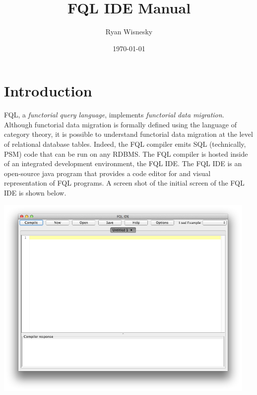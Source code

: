 \documentclass[12pt]{article}
\begin{document}
\title{FQL IDE Manual}
\author{Ryan Wisnesky}
\date{\today}

\maketitle

\vspace{-0.5in}

\begin{footnotesize}
\tableofcontents
\end{footnotesize}
\newpage

\section{Introduction}

FQL, a {\it functorial query language}, implements {\it functorial data migration}.  Although functorial data migration is formally defined using the language of category theory, it is possible to understand functorial data migration at the level of relational database tables.  Indeed, the FQL compiler emits SQL (technically, PSM) code that can be run on any RDBMS.  The FQL compiler is hosted inside of an integrated development environment, the FQL IDE.  The FQL IDE is an open-source java program that provides a code editor for and visual representation of FQL programs.  A screen shot of the initial screen of the FQL IDE is shown below.

\begin{center}
\includegraphics[width=5in]{initial}
\end{center}
\end{document}
